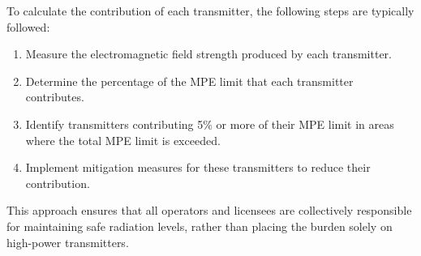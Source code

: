 To calculate the contribution of each transmitter, the following steps are typically followed:
\begin{enumerate}
    \item Measure the electromagnetic field strength produced by each transmitter.
    \item Determine the percentage of the MPE limit that each transmitter contributes.
    \item Identify transmitters contributing 5\% or more of their MPE limit in areas where the total MPE limit is exceeded.
    \item Implement mitigation measures for these transmitters to reduce their contribution.
\end{enumerate}

This approach ensures that all operators and licensees are collectively responsible for maintaining safe radiation levels, rather than placing the burden solely on high-power transmitters.

